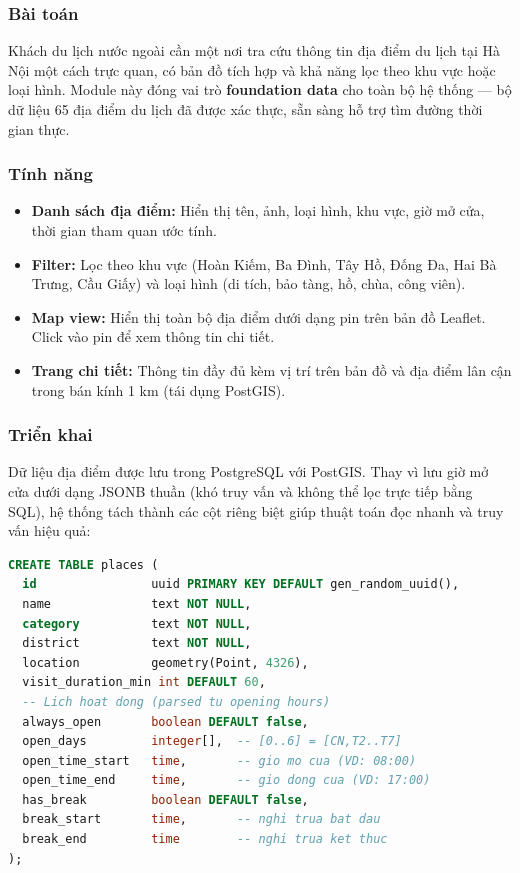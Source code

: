 \documentclass[12pt,a4paper]{article}
\begin{document}
\subsubsection{Bài toán}

Khách du lịch nước ngoài cần một nơi tra cứu thông tin địa điểm du lịch tại
Hà Nội một cách trực quan, có bản đồ tích hợp và khả năng lọc theo khu vực
hoặc loại hình. Module này đóng vai trò \textbf{foundation data} cho toàn bộ
hệ thống --- bộ dữ liệu 65 địa điểm du lịch đã được xác thực, sẵn sàng hỗ trợ
tìm đường thời gian thực.

\subsubsection{Tính năng}

\begin{itemize}
  \item \textbf{Danh sách địa điểm:} Hiển thị tên, ảnh, loại hình, khu vực,
        giờ mở cửa, thời gian tham quan ước tính.
  \item \textbf{Filter:} Lọc theo khu vực (Hoàn Kiếm, Ba Đình, Tây Hồ, Đống Đa,
        Hai Bà Trưng, Cầu Giấy) và loại hình (di tích, bảo tàng, hồ, chùa,
        công viên).
  \item \textbf{Map view:} Hiển thị toàn bộ địa điểm dưới dạng pin trên bản đồ
        Leaflet. Click vào pin để xem thông tin chi tiết.
  \item \textbf{Trang chi tiết:} Thông tin đầy đủ kèm vị trí trên bản đồ và
        địa điểm lân cận trong bán kính 1 km (tái dụng PostGIS).
\end{itemize}

\subsubsection{Triển khai}

Dữ liệu địa điểm được lưu trong PostgreSQL với PostGIS. Thay vì lưu giờ mở cửa
dưới dạng JSONB thuần (khó truy vấn và không thể lọc trực tiếp bằng SQL), hệ
thống tách thành các cột riêng biệt giúp thuật toán đọc nhanh và truy vấn hiệu
quả:

\begin{lstlisting}[language=SQL]
CREATE TABLE places (
  id                uuid PRIMARY KEY DEFAULT gen_random_uuid(),
  name              text NOT NULL,
  category          text NOT NULL,
  district          text NOT NULL,
  location          geometry(Point, 4326),
  visit_duration_min int DEFAULT 60,
  -- Lich hoat dong (parsed tu opening hours)
  always_open       boolean DEFAULT false,
  open_days         integer[],  -- [0..6] = [CN,T2..T7]
  open_time_start   time,       -- gio mo cua (VD: 08:00)
  open_time_end     time,       -- gio dong cua (VD: 17:00)
  has_break         boolean DEFAULT false,
  break_start       time,       -- nghi trua bat dau
  break_end         time        -- nghi trua ket thuc
);
\end{lstlisting}
\end{document}
